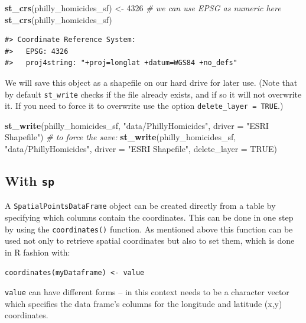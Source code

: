 \documentclass[]{book}
\newenvironment{Shaded}{\begin{snugshade}}{\end{snugshade}}
\newcommand{\KeywordTok}[1]{\textcolor[rgb]{0.13,0.29,0.53}{\textbf{#1}}}
\newcommand{\DataTypeTok}[1]{\textcolor[rgb]{0.13,0.29,0.53}{#1}}
\newcommand{\DecValTok}[1]{\textcolor[rgb]{0.00,0.00,0.81}{#1}}
\newcommand{\StringTok}[1]{\textcolor[rgb]{0.31,0.60,0.02}{#1}}
\newcommand{\CommentTok}[1]{\textcolor[rgb]{0.56,0.35,0.01}{\textit{#1}}}
\newcommand{\OtherTok}[1]{\textcolor[rgb]{0.56,0.35,0.01}{#1}}
\newcommand{\NormalTok}[1]{#1}
\begin{document}
\begin{Shaded}
\begin{Highlighting}[]
\KeywordTok{st_crs}\NormalTok{(philly_homicides_sf) <-}\StringTok{ }\DecValTok{4326} \CommentTok{# we can use EPSG as numeric here}
\KeywordTok{st_crs}\NormalTok{(philly_homicides_sf)}
\end{Highlighting}
\end{Shaded}

\begin{verbatim}
#> Coordinate Reference System:
#>   EPSG: 4326 
#>   proj4string: "+proj=longlat +datum=WGS84 +no_defs"
\end{verbatim}

We will save this object as a shapefile on our hard drive for later use.
(Note that by default \texttt{st\_write} checks if the file already
exists, and if so it will not overwrite it. If you need to force it to
overwrite use the option \texttt{delete\_layer\ =\ TRUE}.)

\begin{Shaded}
\begin{Highlighting}[]
\KeywordTok{st_write}\NormalTok{(philly_homicides_sf, }\StringTok{"data/PhillyHomicides"}\NormalTok{, }\DataTypeTok{driver =} \StringTok{"ESRI Shapefile"}\NormalTok{)}
\CommentTok{# to force the save: }
\KeywordTok{st_write}\NormalTok{(philly_homicides_sf, }\StringTok{"data/PhillyHomicides"}\NormalTok{, }\DataTypeTok{driver =} \StringTok{"ESRI Shapefile"}\NormalTok{, }\DataTypeTok{delete_layer =} \OtherTok{TRUE}\NormalTok{)}
\end{Highlighting}
\end{Shaded}

\subsection{\texorpdfstring{With \texttt{sp}}{With sp}}\label{with-sp}

A \texttt{SpatialPointsDataFrame} object can be created directly from a
table by specifying which columns contain the coordinates. This can be
done in one step by using the \texttt{coordinates()} function. As
mentioned above this function can be used not only to retrieve spatial
coordinates but also to set them, which is done in R fashion with:

\begin{verbatim}
coordinates(myDataframe) <- value
\end{verbatim}

\texttt{value} can have different forms -- in this context needs to be a
character vector which specifies the data frame's columns for the
longitude and latitude (x,y) coordinates.
\end{document}
